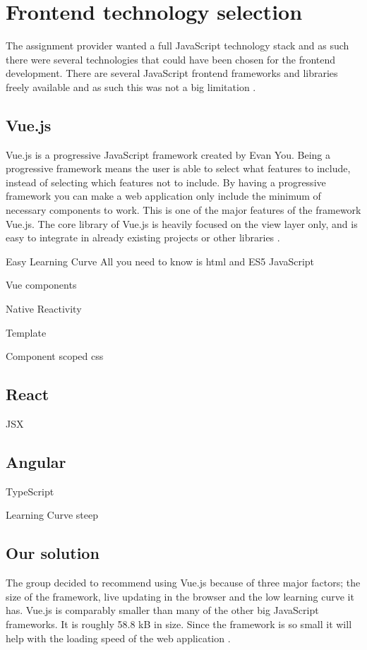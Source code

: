 \section{Frontend technology selection} 

The assignment provider wanted a full JavaScript technology stack and as such there were several technologies that could have been chosen for the frontend development. There are several JavaScript frontend frameworks and libraries freely available and as such this was not a big limitation \cite{JavaScript_libraries}.

\subsection{Vue.js}
Vue.js is a progressive JavaScript framework created by Evan You. Being a progressive framework means the user is able to select what features to include, instead of selecting which features not to include. By having a progressive framework you can make a web application only include the minimum of necessary components to work. This is one of the major features of the framework Vue.js. The core library of Vue.js is heavily focused on the view layer only, and is easy to integrate in already existing projects or other libraries \cite{what_is_Vue}. 

Easy Learning Curve
    All you need to know is html and ES5 JavaScript

Vue components

Native Reactivity

Template

Component scoped css

\subsection{React}
JSX



\subsection{Angular}
TypeScript

Learning Curve steep

\subsection{Our solution}
The group decided to recommend using Vue.js because of three major factors; the size of the framework, live updating in the browser and the low learning curve it has. Vue.js is comparably smaller than many of the other big JavaScript frameworks. It is roughly 58.8 kB in size. Since the framework is so small it will help with the loading speed of the web application \cite{vue-size}. 

